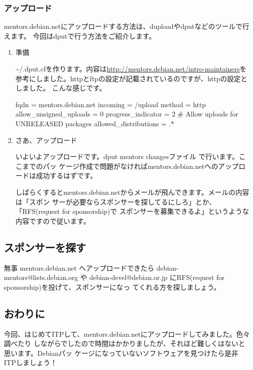 \documentclass[mingoth,a4paper]{jsarticle}
\begin{document}
\subsubsection{アップロード}
mentors.debian.netにアップロードする方法は、duploadやdputなどのツールで行えます。
今回はdputで行う方法をご紹介します。

\begin{enumerate}
\item 準備

\textasciitilde/.dput.cfを作ります。内容は\url{http://mentors.debian.net/intro-maintainers}を
参考にしました。httpとftpの設定が記載されているのですが、httpの設定としました。
こんな感じです。

\begin{commandline}
[mentors]
fqdn = mentors.debian.net
incoming = /upload
method = http
allow_unsigned_uploads = 0
progress_indicator = 2
# Allow uploads for UNRELEASED packages
allowed_distributions = .*
\end{commandline}

\item さあ、アップロード

いよいよアップロードです。dput mentors changesファイル で行います。ここまでのパッ
ケージ作成で問題がなければmentors.debian.netへのアップロードは成功するはずです。

しばらくするとmentors.debian.netからメールが飛んできます。メールの内容は「スポン
サーが必要ならスポンサーを探してるにしろ」とか、「RFS(request for sponsorship)で
スポンサーを募集できるよ」というような内容ですので従います。
\end{enumerate}

\subsection{スポンサーを探す}
無事 mentors.debian.net へアップロードできたら debian-mentors@lists.debian.org や
debian-devel@debian.or.jp にRFS(request for sponsorship)を投げて、スポンサーになっ
てくれる方を探しましょう。

\subsection{おわりに}
今回、はじめてITPして、mentors.debian.netにアップロードしてみました。色々調べたり
しながらでしたので時間はかかりましたが、それほど難しくはないと思います。Debianパッ
ケージになっていないソフトウェアを見つけたら是非ITPしましょう！

\clearpage
\end{document}
